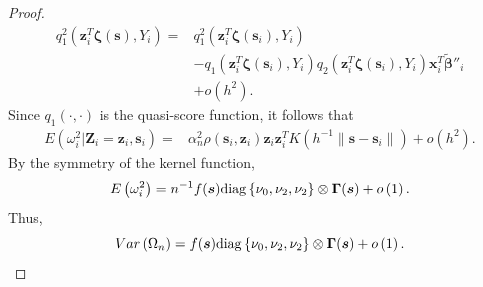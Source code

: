 \documentclass[authoryear,review, 12pt]{elsarticle}
\begin{document}
\begin{proof}
\begin{align*}
q_{1}^{2}\left(\bm{z}_{i}^{T}\bm{\zeta}(\bm{s}),Y_{i}\right)= & q_{1}^{2}\left(\bm{z}_{i}^{T}\bm{\zeta}(\bm{s}_{i}),Y_{i}\right)\\
 & -q_{1}\left(\bm{z}_{i}^{T}\bm{\zeta}(\bm{s}_{i}),Y_{i}\right)q_{2}\left(\bm{z}_{i}^{T}\bm{\zeta}(\bm{s}_{i}),Y_{i}\right)\bm{x}_{i}^{T}\tilde{\bm{\beta}}''_{i}\\
 & +o\left(h^{2}\right).
\end{align*}
Since $q_{1}\left(\cdot,\cdot\right)$ is the quasi-score function,
it follows that 
\begin{align*}
E\left(\omega_{i}^{2}|\bm{Z}_{i}=\bm{z}_{i},\bm{s}_{i}\right)= & \alpha_{n}^{2}\rho(\bm{s}_{i},\bm{z}_{i})\bm{z}_{i}\bm{z}_{i}^{T}K\left(h^{-1}\|\bm{s}-\bm{s}_{i}\|\right)+o\left(h^{2}\right).
\end{align*}
By the symmetry of the kernel function,
\[
E\left(\omega_{i}^{2}\right)=n^{-1}f(\bm{s}){\rm diag}\left\{ \nu_{0},\nu_{2},\nu_{2}\right\} \otimes\bm{\Gamma}(\bm{s})+o\left(1\right).
\]
Thus, 
\[
Var\left(\Omega_{n}\right)=f(\bm{s}){\rm diag}\left\{ \nu_{0},\nu_{2},\nu_{2}\right\} \otimes\bm{\Gamma}(\bm{s})+o\left(1\right).
\]
\end{proof}
\end{document}
